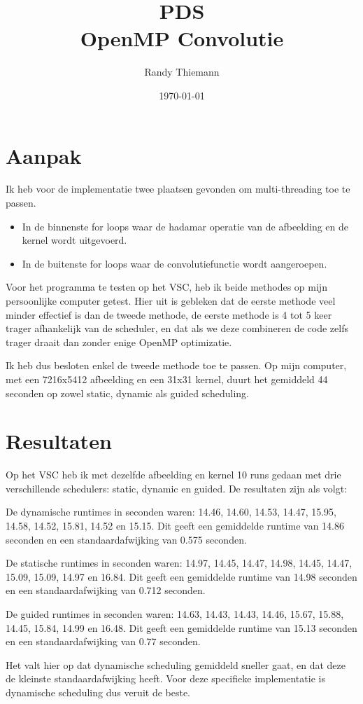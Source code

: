 \documentclass[a4paper,11pt]{article}
\begin{document}
\author{Randy Thiemann} 
\title{PDS \\ OpenMP Convolutie} 
\date{\today}
\maketitle

\section{Aanpak}
Ik heb voor de implementatie twee plaatsen gevonden om multi-threading toe te
passen. 

\begin{itemize}
    \item In de binnenste for loops waar de hadamar operatie van de afbeelding 
        en de kernel wordt uitgevoerd.
    \item In de buitenste for loops waar de convolutiefunctie wordt aangeroepen.
\end{itemize}

Voor het programma te testen op het VSC, heb ik beide methodes op mijn
persoonlijke computer getest. Hier uit is gebleken dat de eerste methode veel
minder effectief is dan de tweede methode, de eerste methode is 4 tot 5 keer 
trager afhankelijk van de scheduler, en dat als we deze combineren de code
zelfs trager draait dan zonder enige OpenMP optimizatie.

Ik heb dus besloten enkel de tweede methode toe te passen. Op mijn computer, met
een 7216x5412 afbeelding en een 31x31 kernel, duurt het gemiddeld 44 seconden op
zowel static, dynamic als guided scheduling.

\section{Resultaten}
Op het VSC heb ik met dezelfde afbeelding en kernel 10 runs gedaan met drie
verschillende schedulers: static, dynamic en guided. De resultaten zijn als
volgt:

De dynamische runtimes in seconden waren: 14.46, 14.60, 14.53, 14.47, 15.95, 
14.58, 14.52, 15.81, 14.52 en 15.15. Dit geeft een gemiddelde runtime van 14.86
seconden en een standaardafwijking van 0.575 seconden.

De statische runtimes in seconden waren: 14.97, 14.45, 14.47, 14.98, 14.45, 
14.47, 15.09, 15.09, 14.97 en 16.84. Dit geeft een gemiddelde runtime van 14.98
seconden en een standaardafwijking van 0.712 seconden.

De guided runtimes in seconden waren: 14.63, 14.43, 14.43, 14.46, 15.67, 15.88, 
14.45, 15.84, 14.99 en 16.48. Dit geeft een gemiddelde runtime van 15.13 
seconden en een standaardafwijking van 0.77 seconden.

Het valt hier op dat dynamische scheduling gemiddeld sneller gaat, en dat deze
de kleinste standaardafwijking heeft. Voor deze specifieke implementatie is
dynamische scheduling dus veruit de beste.
\end{document}
